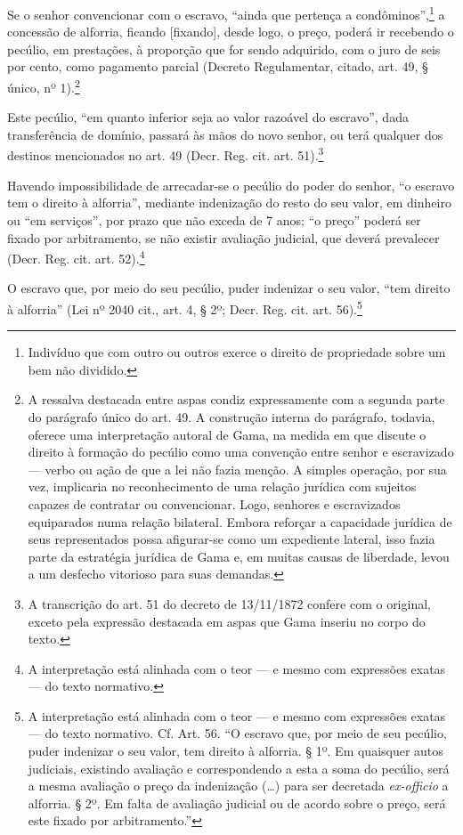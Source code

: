 Se o senhor convencionar com o escravo, ``ainda que pertença a
condôminos'',\footnote{Indivíduo que com outro ou outros exerce o
  direito de propriedade sobre um bem não dividido.} a concessão de
alforria, ficando {[}fixando{]}, desde logo, o preço, poderá ir
recebendo o pecúlio, em prestações, à proporção que for sendo adquirido,
com o juro de seis por cento, como pagamento parcial (Decreto
Regulamentar, citado, art. 49, § único, nº
1).\footnote{A ressalva destacada entre aspas condiz expressamente com
  a segunda parte do parágrafo único do art. 49. A construção interna do
  parágrafo, todavia, oferece uma interpretação autoral de Gama,
  na medida em que discute o direito à formação do pecúlio como uma
  convenção entre senhor e escravizado --- verbo ou ação de que a lei não
  fazia menção. A simples operação, por sua vez, implicaria no
  reconhecimento de uma relação jurídica com sujeitos capazes de
  contratar ou convencionar. Logo, senhores e escravizados equiparados
  numa relação bilateral. Embora reforçar a capacidade jurídica de seus
  representados possa afigurar-se como um expediente lateral, isso fazia
  parte da estratégia jurídica de Gama e, em muitas causas de liberdade,
  levou a um desfecho vitorioso para suas demandas.}

Este pecúlio, ``em quanto inferior seja ao valor razoável do escravo'',
dada transferência de domínio, passará às mãos do novo senhor, ou terá
qualquer dos destinos mencionados no art. 49 (Decr. Reg. cit. art.
51).\footnote{A transcrição do art. 51 do decreto de 13/11/1872
  confere com o original, exceto pela expressão destacada em aspas que
  Gama inseriu no corpo do texto.}

Havendo impossibilidade de arrecadar-se o pecúlio do poder do senhor, ``o
escravo tem o direito à alforria'', mediante indenização do resto do seu
valor, em dinheiro ou ``em serviços'', por prazo que não exceda de 7 anos;
``o preço'' poderá ser fixado por arbitramento, se não existir avaliação
judicial, que deverá prevalecer (Decr. Reg. cit. art. 52).\footnote{A
  interpretação está alinhada com o teor --- e mesmo com expressões exatas ---
  do texto normativo.}

O escravo que, por meio do seu pecúlio, puder indenizar o seu valor,
``tem direito à alforria'' (Lei nº 2040 cit., art. 4, § 2º; Decr. Reg.
cit. art. 56).\footnote{A interpretação está alinhada com o teor --- e %
  mesmo com expressões exatas --- do texto normativo. Cf. Art. 56. ``O escravo
  que, por meio de seu pecúlio, puder indenizar o seu valor, tem direito
  à alforria. § 1º. Em quaisquer autos judiciais, existindo avaliação e
  correspondendo a esta a soma do pecúlio, será a mesma avaliação o
  preço da indenização (\ldots{}) para ser decretada \emph{ex-officio} a
  alforria. § 2º. Em falta de avaliação judicial ou de acordo sobre o
  preço, será este fixado por arbitramento.''}

